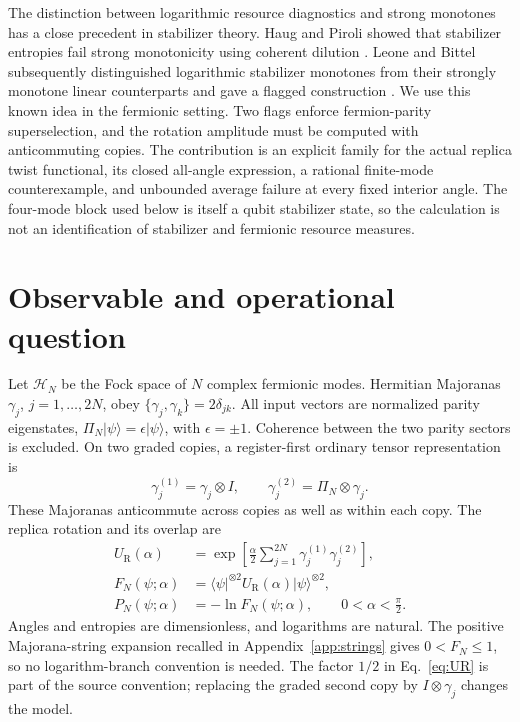 \documentclass[aps,pra,reprint,amsmath,amssymb,longbibliography,floatfix]{revtex4-2}
\newcommand{\ket}[1]{\lvert #1\rangle}
\newcommand{\bra}[1]{\langle #1\rvert}
\newcommand{\twist}{U_{\mathrm R}}
\newcommand{\Ptw}{P}
\newcommand{\Ftw}{F}
\begin{document}
The distinction between logarithmic resource diagnostics and strong
monotones has a close precedent in stabilizer theory.
Haug and Piroli showed that stabilizer entropies fail strong
monotonicity using coherent dilution \cite{HaugPiroli2023}.
Leone and Bittel subsequently distinguished logarithmic stabilizer
monotones from their strongly monotone linear counterparts and gave
a flagged construction \cite{LeoneBittelMagic2024}.
We use this known idea in the fermionic setting. Two flags enforce
fermion-parity superselection, and the rotation amplitude must be
computed with anticommuting copies.
The contribution is an explicit family for the actual replica twist
functional, its closed all-angle expression, a rational finite-mode
counterexample, and unbounded average failure at every fixed interior
angle. The four-mode block used below is itself a qubit stabilizer
state, so the calculation is not an identification of stabilizer and
fermionic resource measures.

\section{Observable and operational question}
\label{sec:model}

Let \(\mathcal H_N\) be the Fock space of \(N\) complex fermionic modes.
Hermitian Majoranas \(\gamma_j\), \(j=1,\ldots,2N\), obey
\(\{\gamma_j,\gamma_k\}=2\delta_{jk}\).
All input vectors are normalized parity eigenstates,
\(\Pi_N\ket{\psi}=\epsilon\ket{\psi}\), with
\(\epsilon=\pm1\). Coherence between the two parity sectors is excluded.
On two graded copies, a register-first ordinary tensor representation is
\begin{equation}
 \gamma_j^{(1)}=\gamma_j\otimes I,\qquad
 \gamma_j^{(2)}=\Pi_N\otimes\gamma_j .
 \label{eq:graded}
\end{equation}
These Majoranas anticommute across copies as well as within each copy.
The replica rotation and its overlap are
\begin{align}
 \twist(\alpha)&=\exp\!\left[
   \frac{\alpha}{2}\sum_{j=1}^{2N}
       \gamma_j^{(1)}\gamma_j^{(2)}\right],\label{eq:UR}\\
 \Ftw_N(\psi;\alpha)&=\bra{\psi}^{\otimes2}
       \twist(\alpha)\ket{\psi}^{\otimes2},\label{eq:F}\\
 \Ptw_N(\psi;\alpha)&=-\ln \Ftw_N(\psi;\alpha),
       \qquad 0<\alpha<\frac{\pi}{2}.\label{eq:P}
\end{align}
Angles and entropies are dimensionless, and logarithms are natural.
The positive Majorana-string expansion recalled in Appendix~\ref{app:strings}
gives \(0<\Ftw_N\leq1\), so no logarithm-branch convention is needed.
The factor \(1/2\) in Eq.~\eqref{eq:UR} is part of the source convention;
replacing the graded second copy by \(I\otimes\gamma_j\) changes the model.
\end{document}
